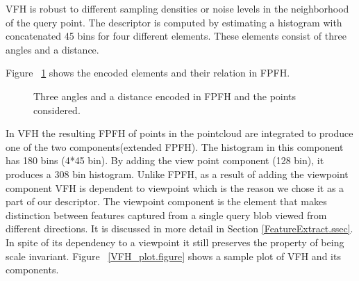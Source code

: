 VFH is robust to different sampling densities or noise levels in the neighborhood of the query point. 
The descriptor is computed by estimating a histogram with concatenated 45 bins for four different elements.
These elements consist of three angles and a distance. 




Figure  ~\ref{FPFH.figure} shows the encoded elements and their relation in FPFH.

\begin{figure}[t]
  \caption[FPFH elements.]
  {Three angles and a distance encoded in FPFH and the points considered.\cite{VFH_Definition}}
  \label{FPFH.figure}
\end{figure}

In VFH the resulting FPFH of points in the pointcloud are integrated to produce one of the two 
components(extended FPFH).
The histogram in this component has 180 bins (4*45 bin).
By adding the view point component (128 bin), it produces a 308 bin histogram. 
Unlike FPFH, as a result of adding the viewpoint component VFH is dependent to viewpoint which is the reason we chose
it as a part of our descriptor.
The viewpoint component is the element that makes distinction between features captured from a single query blob viewed 
from different directions.
It is discussed in more detail in Section \ref{FeatureExtract.ssec}.
In spite of its dependency to a viewpoint it still preserves the property of being scale invariant. 
Figure ~\ref{VFH_plot.figure} shows a sample plot of VFH and its components.

